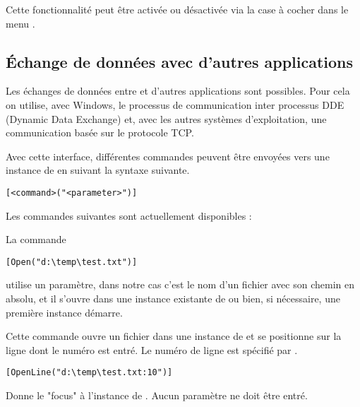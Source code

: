 
Cette fonctionnalité peut être activée ou désactivée via la case à cocher  dans le menu .


\subsection{Échange de données avec d'autres applications}

Les échanges de données entre \codeblocks et d'autres applications sont possibles. Pour cela on utilise, avec Windows, le processus de communication inter processus DDE (Dynamic Data Exchange) et, avec les autres systèmes d'exploitation, une communication basée sur le protocole TCP.

Avec cette interface, différentes commandes peuvent être envoyées vers une instance de \codeblocks en suivant la syntaxe suivante.

\begin{lstlisting}
[<command>("<parameter>")]
\end{lstlisting}

Les commandes suivantes sont actuellement disponibles :

\begin{codeentry}
\item[Open] La commande

\begin{lstlisting}
[Open("d:\temp\test.txt")]
\end{lstlisting}

utilise un paramètre, dans notre cas c'est le nom d'un fichier avec son chemin en absolu, et il s'ouvre dans une instance existante de \codeblocks ou bien, si nécessaire, une première instance démarre.
\item[OpenLine] Cette commande ouvre un fichier dans une instance de \codeblocks et se positionne sur la ligne dont le numéro est entré. Le numéro de ligne est spécifié par .

\begin{lstlisting}
[OpenLine("d:\temp\test.txt:10")]
\end{lstlisting}

\item[Raise] Donne le "focus" à l'instance de \codeblocks. Aucun paramètre ne doit être entré.
\end{codeentry}

